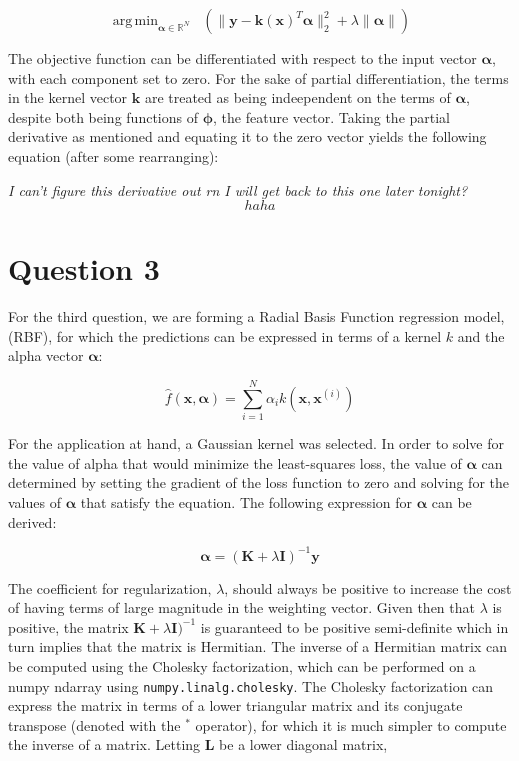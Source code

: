 \documentclass{article}
\DeclareMathOperator*{\argmin}{arg\,min}
\begin{document}
\begin{equation}
\argmin_{\boldsymbol\alpha \in \mathbb{R}^N} \;\; (\| \mathbf{y} - \mathbf{k(x)}^T\boldsymbol\alpha \|_{2}^2 + \lambda \|\boldsymbol\alpha \|)
\end{equation}

The objective function can be differentiated with respect to the input vector $\boldsymbol\alpha$, with each component set to zero. For the sake of partial differentiation, the terms in the kernel vector $\mathbf{k}$ are treated as being indeependent on the terms of $\boldsymbol\alpha$, despite both being functions of $\boldsymbol\phi$, the feature vector. Taking the partial derivative as mentioned and equating it to the zero vector yields the following equation (after some rearranging):

\textit{I can't figure this derivative out rn I will get back to this one later tonight?}
\begin{equation}
haha
\end{equation}

\section*{Question 3}
For the third question, we are forming a Radial Basis Function regression model, (RBF), for which the predictions can be expressed in terms of a kernel $k$ and the alpha vector $\boldsymbol\alpha$:

\begin{equation}
\hat{f}(\mathbf{x}, \boldsymbol\alpha) = \sum_{i=1}^{N} \alpha_i k(\mathbf{x}, \mathbf{x}^{(i)})
\end{equation}

For the application at hand, a Gaussian kernel was selected. In order to solve for the value of alpha that would minimize the least-squares loss, the value of $\boldsymbol\alpha$ can determined by setting the gradient of the loss function to zero and solving for the values of $\boldsymbol\alpha$ that satisfy the equation. The following expression for $\boldsymbol\alpha$ can be derived:

\begin{equation}
\boldsymbol\alpha = (\mathbf{K} + \lambda \mathbf{I})^{-1} \mathbf{y}
\end{equation}

The coefficient for regularization, $\lambda$, should always be positive to increase the cost of having terms of large magnitude in the weighting vector. Given then that $\lambda$ is positive, the matrix $\mathbf{K} + \lambda \mathbf{I})^{-1}$ is guaranteed to be positive semi-definite which in turn implies that the matrix is Hermitian. The inverse of a Hermitian matrix can be computed using the Cholesky factorization, which can be performed on a numpy ndarray using \verb+numpy.linalg.cholesky+. The Cholesky factorization can express the matrix in terms of a lower triangular matrix and its conjugate transpose (denoted with the $^*$ operator), for which it is much simpler to compute the inverse of a matrix. Letting $\mathbf{L}$ be a lower diagonal matrix,
\end{document}
